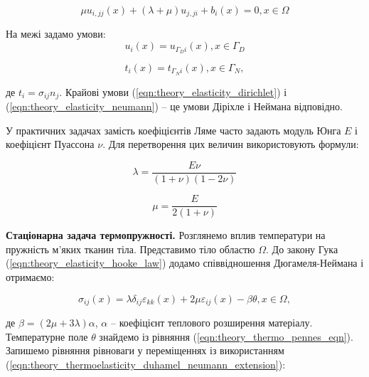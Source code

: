 \begin{equation}
    \label{eqn:theory_elasticity_displacement_eqn}
    \mu u_{i,jj}(x) + (\lambda + \mu)u_{j,ji} + b_i(x) = 0, x \in \Omega
\end{equation}

\noindent На межі задамо умови:
\begin{equation}
    \label{eqn:theory_elasticity_dirichlet}
    u_i(x) = u_{\Gamma_Di}(x), x \in \Gamma_D
\end{equation}

\begin{equation}
    \label{eqn:theory_elasticity_neumann}
    t_i(x) = t_{\Gamma_Ni}(x), x \in \Gamma_N,
\end{equation}

\noindent де $t_i = \sigma_{ij}n_j$. Крайові умови (\ref{eqn:theory_elasticity_dirichlet}) і
(\ref{eqn:theory_elasticity_neumann}) -- це умови Діріхле і Неймана відповідно.

У практичних задачах замість коефіцієнтів Ляме часто задають модуль Юнга $E$ і коефіцієнт Пуассона $\nu$. Для
перетворення цих величин використовують формули: 

\begin{equation}
    \label{eqn:theory_elasticity_lame_lambda_convertion}
    \lambda = \frac{E\nu}{(1+\nu)(1-2\nu)}
\end{equation}

\begin{equation}
    \label{eqn:theory_elasticity_lame_mu_convertion}
    \mu = \frac{E}{2(1+\nu)}
\end{equation}

\textbf{Стаціонарна задача термопружності.} Розглянемо вплив температури на пружність м'яких тканин тіла. 
Представимо тіло областю $\Omega$. До закону Гука (\ref{eqn:theory_elasticity_hooke_law}) додамо співвідношення 
Дюгамеля-Неймана і отримаємо:

\begin{equation}
    \label{eqn:theory_thermoelasticity_duhamel_neumann_extension}
    \sigma_{ij}(x) = \lambda \delta_{ij}\varepsilon_{kk}(x) + 2\mu\varepsilon_{ij}(x) - \beta \theta, x \in \Omega,
\end{equation}

\noindent де $\beta = (2\mu + 3\lambda)\alpha$, $\alpha$ -- коефіцієнт теплового розширення матеріалу. Температурне поле
$\theta$ знайдемо із рівняння (\ref{eqn:theory_thermo_pennes_eqn}). Запишемо рівняння рівноваги у переміщеннях із
використанням (\ref{eqn:theory_thermoelasticity_duhamel_neumann_extension}):

